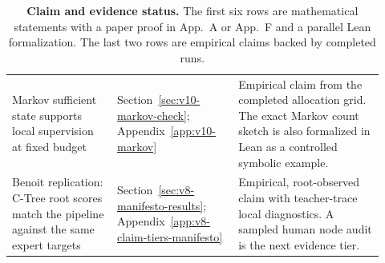 \begin{table}[t]
\begin{tabular}{@{}p{0.26\linewidth}p{0.30\linewidth}p{0.36\linewidth}@{}}
\addlinespace
Markov sufficient state supports local supervision at fixed budget &
Section~\ref{sec:v10-markov-check};
Appendix~\ref{app:v10-markov} &
Empirical claim from the completed allocation grid. The exact Markov
count sketch is also formalized in Lean as a controlled symbolic
example. \\
\addlinespace
Benoit replication: C-Tree root scores match the
\citet{BenoitEtAl2025} pipeline against the same expert targets &
Section~\ref{sec:v8-manifesto-results};
Appendix~\ref{app:v8-claim-tiers-manifesto} &
Empirical, root-observed claim with teacher-trace local diagnostics.
A sampled human node audit is the next evidence tier. \\
\bottomrule
\end{tabular}
\caption{\textbf{Claim and evidence status.} The first six rows are
mathematical statements with a paper proof in App.~A or App.~F and a
parallel Lean formalization. The last two rows are empirical claims
backed by completed runs.}
\label{tab:v10-claim-status}
\end{table}

